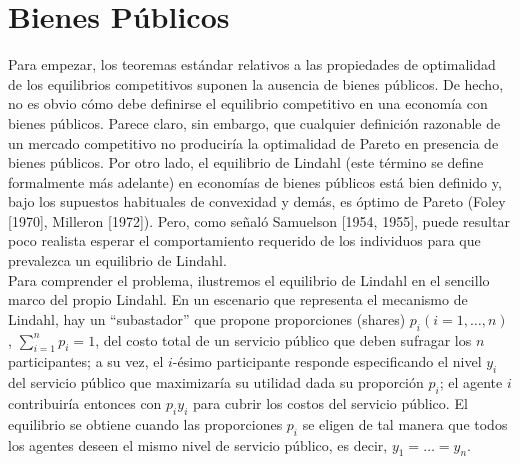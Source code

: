 \documentclass[12pt, letterpaper]{article}
\begin{document}
\section*{Bienes Públicos}
Para empezar, los teoremas estándar relativos a las propiedades de optimalidad de los equilibrios competitivos suponen la ausencia de bienes públicos. De hecho, no es obvio cómo debe definirse el equilibrio competitivo en una economía con bienes públicos. Parece claro, sin embargo, que cualquier definición razonable de un mercado competitivo no produciría la optimalidad de Pareto en presencia de bienes públicos. Por otro lado, el equilibrio de Lindahl (este término se define formalmente más adelante) en economías de bienes públicos está bien definido y, bajo los supuestos habituales de convexidad y demás, es óptimo de Pareto (Foley [1970], Milleron [1972]). Pero, como señaló Samuelson [1954, 1955], puede resultar poco realista esperar el comportamiento requerido de los individuos para que prevalezca un equilibrio de Lindahl. \\


Para comprender el problema, ilustremos el equilibrio de Lindahl en el sencillo marco del propio Lindahl. En un escenario que representa el mecanismo de Lindahl, hay un ``subastador'' que propone proporciones (shares) $p_i (i = 1, \dots, n)$, $\sum_{i=1}^n p_i = 1$, del costo total de un servicio público que deben sufragar los $n$ participantes; a su vez, el $i$-ésimo participante responde especificando el nivel $y_i$ del servicio público que maximizaría su utilidad dada su proporción $p_i$; el agente $i$ contribuiría entonces con $p_i y_i$ para cubrir los costos del servicio público. El equilibrio se obtiene cuando las proporciones $p_i$ se eligen de tal manera que todos los agentes deseen el mismo nivel de servicio público, es decir, $y_1 = \dots = y_n$. \\
\end{document}
